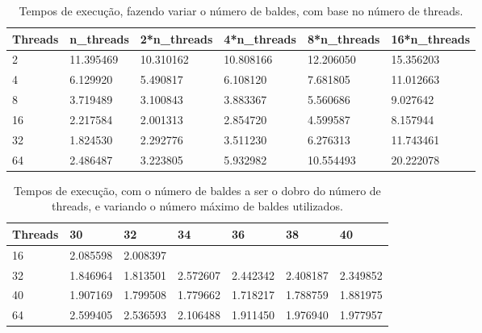 \documentclass[a4paper]{report}
\begin{document}
\begin{table}[h]
\centering
\begin{tabular}{|l|l|l|l|l|l|}
\hline
Threads & n\_threads & 2*n\_threads & 4*n\_threads & 8*n\_threads & 16*n\_threads \\ \hline
2       & 11.395469  & 10.310162    & 10.808166    & 12.206050    & 15.356203     \\ \hline
4       & 6.129920   & 5.490817     & 6.108120     & 7.681805     & 11.012663     \\ \hline
8       & 3.719489   & 3.100843     & 3.883367     & 5.560686     & 9.027642      \\ \hline
16      & 2.217584   & 2.001313     & 2.854720     & 4.599587     & 8.157944      \\ \hline
32      & 1.824530   & 2.292776     & 3.511230     & 6.276313     & 11.743461     \\ \hline
64      & 2.486487   & 3.223805     & 5.932982     & 10.554493    & 20.222078     \\ \hline
\end{tabular}
\caption{\label{tab:var_size}Tempos de execução, fazendo variar o
    número de baldes, com base no número de threads.}
\end{table}

\begin{table}[h]
\centering
\begin{tabular}{|l|l|l|l|l|l|l|}
\hline
Threads & 30       & 32       & 34       & 36       & 38       & 40       \\ \hline
16      & 2.085598 & 2.008397 &          &          &          &          \\ \hline
32      & 1.846964 & 1.813501 & 2.572607 & 2.442342 & 2.408187 & 2.349852 \\ \hline
40      & 1.907169 & 1.799508 & 1.779662 & 1.718217 & 1.788759 & 1.881975 \\ \hline
64      & 2.599405 & 2.536593 & 2.106488 & 1.911450 & 1.976940 & 1.977957 \\ \hline
\end{tabular}
\caption{\label{tab:var_size}Tempos de execução, com o número de baldes a ser o
    dobro do número de threads, e variando o número máximo de baldes
    utilizados.}
\end{table}
\end{document}
